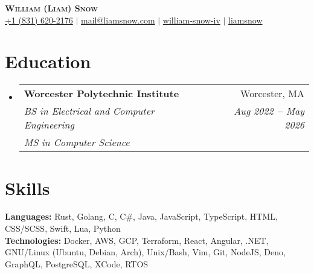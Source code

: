 \documentclass[12pt]{article}
\makeatletter
\newcommand{\entry}[1]{
  \item\small{
    {#1 \vspace{-2pt}}
  }
}
\newcommand{\educationheading}[6]{
  \vspace{-2pt}\item
    \begin{tabular*}{0.97\textwidth}[t]{l@{\extracolsep{\fill}}r}
      \textbf{#1} & #2 \\
      \textit{\small#3} & \textit{\small #4} \\
      \textit{\small#5} & \textit{\small #6} \\
    \end{tabular*}\vspace{-5pt}
}
\newcommand{\subheadingliststart}{\begin{itemize}[leftmargin=0.15in, label={}]}
\newcommand{\subheadinglistend}{\end{itemize}}
\makeatother
\begin{document}
\begin{center}
  \textbf{\Huge \scshape William (Liam) Snow} \\ \vspace{3pt}
    \small
    \faMobile \hspace{.5pt} \href{tel:8316202176}{+1 (831) 620-2176}
    $|$
    \faAt \hspace{.5pt} \href{mailto:mail@liamsnow.com}{mail@liamsnow.com}
    $|$
    \faLinkedinSquare \hspace{.5pt} \href{https://www.linkedin.com/in/william-snow-iv-140438169/}{william-snow-iv}
    $|$
    \faGithub \hspace{.5pt} \href{https://github.com/liamsnow}{liamsnow}
\end{center}

\section{Education}
  \vspace{3pt}
  \subheadingliststart
    \educationheading
      {Worcester Polytechnic Institute}{Worcester, MA}
      {BS in Electrical and Computer Engineering}{Aug 2022 \textbf{--} May 2026}
      {MS in Computer Science}{}
  \subheadinglistend

\section{Skills}
  \vspace{2pt}
  \subheadingliststart
    \small{\entry{
        \textbf{Languages:}{ Rust, Golang, C, C\#, Java, JavaScript, TypeScript, HTML, CSS/SCSS, Swift, Lua, Python } \\ \vspace{3pt}
        \textbf{Technologies:}{ Docker, AWS, GCP, Terraform, React, Angular, .NET, GNU/Linux (Ubuntu, Debian, Arch), Unix/Bash, Vim, Git, NodeJS, Deno, GraphQL, PostgreSQL, XCode, RTOS  } \\ \vspace{3pt}
    }}
  \subheadinglistend
\end{document}
